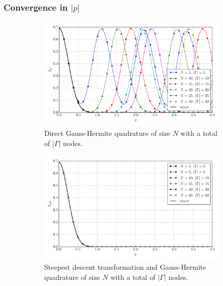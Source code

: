 \documentclass[a4paper,10pt]{article}
\begin{document}
\FloatBarrier
\subsubsection{Convergence in $|p|$}


\begin{figure}[ht!]
  \begin{subfigure}[t]{0.5\linewidth}
    \includegraphics[width=\linewidth]{./plots/tp_1d_conv_p_0_0_val_qr.pdf}
    \caption{Direct Gauss-Hermite quadrature of size $N$ with a total of $|\Gamma|$ nodes.}
    \label{fig:tp_1d_conv_p_0_0_val_qr}
  \end{subfigure}
  \begin{subfigure}[t]{0.5\linewidth}
    \includegraphics[width=\linewidth]{./plots/tp_1d_conv_p_0_0_val_nsd.pdf}
    \caption{Steepest descent transformation and Gauss-Hermite quadrature of size $N$ with a total of $|\Gamma|$ nodes.}
    \label{fig:tp_1d_conv_p_0_0_val_nsd}
  \end{subfigure} \\
  \begin{subfigure}[t]{0.5\linewidth}

\end{subfigure}
\end{figure}
\end{document}

